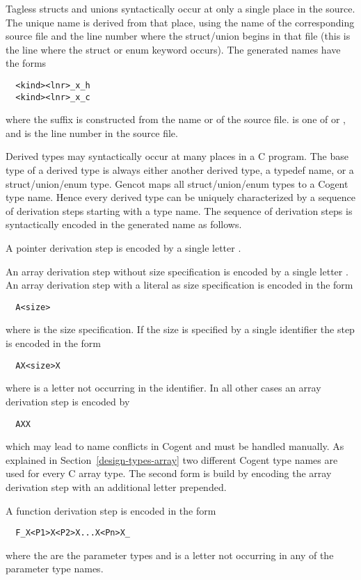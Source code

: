 Tagless structs and unions syntactically occur at only a single place in the source. The unique name is derived from 
that place, using the name of the corresponding source file and the line number where the struct/union begins
in that file (this is the line where the struct or enum keyword occurs).
The generated names have the forms
\begin{verbatim}
  <kind><lnr>_x_h
  <kind><lnr>_x_c
\end{verbatim}
where the suffix is constructed from the name  or  of the source file.  is one of
 or , and  is the line number in the source file.

Derived types may syntactically occur at many places in a C program. The base type of a derived
type is always either another derived type, a typedef name, or a struct/union/enum type. Gencot maps all
struct/union/enum types to a Cogent type name. Hence every derived type can be uniquely characterized by a sequence
of derivation steps starting with a type name. The sequence of derivation steps is syntactically encoded in the 
generated name as follows.

A pointer derivation step is encoded by a single letter . 

An array derivation step without size
specification is encoded by a single letter . An array derivation step with a literal
as size specification is encoded in the form
\begin{verbatim}
  A<size>
\end{verbatim}
where  is the size specification. If the size is specified by a single identifier the 
step is encoded in the form
\begin{verbatim}
  AX<size>X
\end{verbatim}
where  is a letter not occurring in the identifier.
In all other cases an array derivation step is encoded by
\begin{verbatim}
  AXX
\end{verbatim}
which may lead to name conflicts in Cogent and must be handled manually. As explained in Section~\ref{design-types-array}
two different Cogent type names are used for every C array type. The second form is build by encoding 
the array derivation step with an additional letter  prepended.

A function derivation step is encoded in the form
\begin{verbatim}
  F_X<P1>X<P2>X...X<Pn>X_
\end{verbatim}
where the  are the parameter types and  is a letter not occurring in any of the parameter
type names. 

